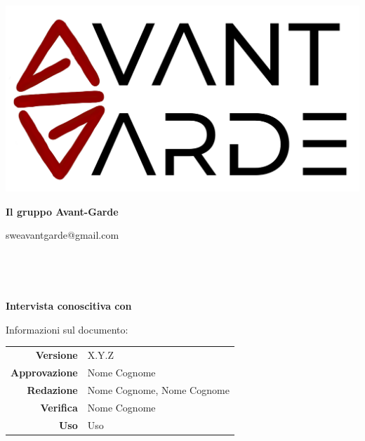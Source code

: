     \begin{titlepage}
        \begin{center}
            \includegraphics[width=\textwidth]{logo+scritta.png}

            \vspace{0.5cm}
            {\huge \textbf{Il gruppo Avant-Garde}}

            \vspace{0.4cm}
            \large{sweavantgarde@gmail.com}

            \vspace{1.5cm}
            \hrulefill\\
            \vspace{0.2cm}
            
            \textbf{\titoloDocumento}\\
            \vspace{0.1cm}

            \hspace{10cm}
            \textbf{Intervista conoscitiva con \textcolor{red}{\nomeAzienda}}\\
            \hrulefill

            \vfill
            Informazioni sul documento:\\
            \vspace{0.3cm}
                \begin{tabular}{ r | l }
                    \textbf{Versione} & X.Y.Z\\ %
                    \textbf{Approvazione} & Nome Cognome\\ %
                    \textbf{Redazione} & Nome Cognome, Nome Cognome\\ %
                    \textbf{Verifica} & Nome Cognome\\ %
                    \textbf{Uso} & Uso\\ %
                \end{tabular}
        \end{center}
    \end{titlepage}
\restoregeometry